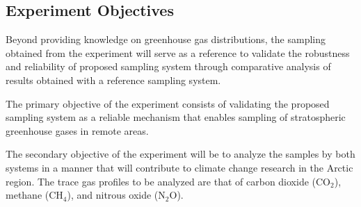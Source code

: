 \subsection{Experiment Objectives}

Beyond providing knowledge on greenhouse gas distributions, the sampling obtained from the experiment will serve as a reference to validate the robustness and reliability of proposed sampling system through comparative analysis of results obtained with a reference sampling system.

The primary objective of the experiment consists of validating the proposed sampling system as a reliable mechanism that enables sampling of stratospheric greenhouse gases in remote areas.

The secondary objective of the experiment will be to analyze the samples by both systems in a manner that will contribute to climate change research in the Arctic region. The trace gas profiles to be analyzed are that of carbon dioxide (CO$_{2}$), methane (CH$_{4}$), and nitrous oxide (N$_{2}$O). 